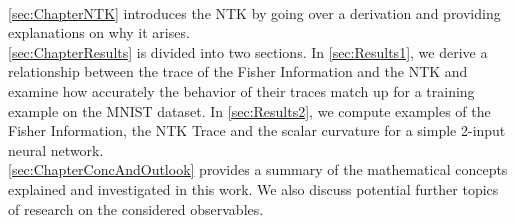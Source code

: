 \\
\cref{sec:ChapterNTK} introduces the NTK by going over a derivation and providing explanations on why it arises.\\
\cref{sec:ChapterResults} is divided into two sections. In \cref{sec:Results1}, we derive a relationship between the trace of the Fisher Information and the NTK and examine how accurately the behavior of their traces match up for a training example on the MNIST dataset. In \cref{sec:Results2}, we compute examples of the Fisher Information, the NTK Trace and the scalar curvature for a simple 2-input neural network.\\
\cref{sec:ChapterConcAndOutlook} provides a summary of the mathematical concepts explained and investigated in this work. We also discuss potential further topics of research on the considered observables.